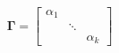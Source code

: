 \documentclass[10pt]{article}
\begin{document}
\[  \boldsymbol \Gamma =
  \begin{bmatrix}
    \alpha_{1} & & \\
    & \ddots & \\
    & & \alpha_{k}
  \end{bmatrix}
\]
\end{document}
